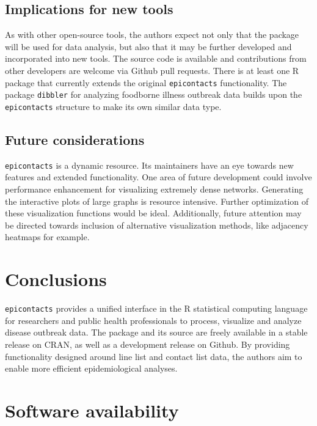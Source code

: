 \documentclass[9pt,a4paper,]{extarticle}
\theoremstyle{definition}
\theoremstyle{definition}
\theoremstyle{definition}
\theoremstyle{remark}
\begin{document}
\subsection{Implications for new tools}\label{implications-for-new-tools}

As with other open-source tools, the authors expect not only that the package will be used for data analysis, but also that it may be further developed and incorporated into new tools. The source code is available and contributions from other developers are welcome via Github pull requests. There is at least one R package that currently extends the original \texttt{epicontacts} functionality. The package \texttt{dibbler} for analyzing foodborne illness outbreak data builds upon the \texttt{epicontacts} structure to make its own similar data type\citep{dibbler}.

\subsection{Future considerations}\label{future-considerations}

\texttt{epicontacts} is a dynamic resource. Its maintainers have an eye towards new features and extended functionality. One area of future development could involve performance enhancement for visualizing extremely dense networks. Generating the interactive plots of large graphs is resource intensive. Further optimization of these visualization functions would be ideal. Additionally, future attention may be directed towards inclusion of alternative visualization methods, like adjacency heatmaps for example.

\section{Conclusions}\label{conclusions}

\texttt{epicontacts} provides a unified interface in the R statistical computing language for researchers and public health professionals to process, visualize and analyze disease outbreak data. The package and its source are freely available in a stable release on CRAN, as well as a development release on Github. By providing functionality designed around line list and contact list data, the authors aim to enable more efficient epidemiological analyses.

\section{Software availability}\label{software-availability}
\end{document}
